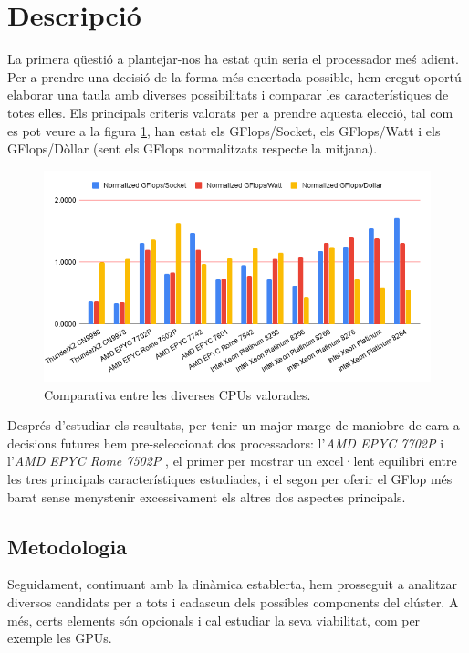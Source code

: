 \section{Descripció}

La primera qüestió a plantejar-nos ha estat quin seria el processador meś adient. Per a prendre una decisió de la forma més encertada possible, hem cregut oportú elaborar una taula amb diverses possibilitats i comparar les característiques de totes elles. Els principals criteris valorats per a prendre aquesta elecció, tal com es pot veure a la figura \ref{chartCPUs}, han estat els GFlops/Socket, els GFlops/Watt i els GFlops/Dòllar (sent els GFlops normalitzats respecte la mitjana). 

\begin{figure}[h]
    \centering
    \includegraphics[width=\textwidth]{img/chartCPU}
    \caption{Comparativa entre les diverses CPUs valorades.}
    \label{chartCPUs}
\end{figure}

Després d'estudiar els resultats, per tenir un major marge de maniobre de cara a decisions futures hem pre-seleccionat dos processadors: l'\textit{AMD EPYC 7702P} \cite{cpu_amd_7702_buy} i l'\textit{AMD EPYC Rome 7502P} \cite{cpu_amd_7502_buy}, el primer per mostrar un excel·lent equilibri entre les tres principals característiques estudiades, i el segon per oferir el GFlop més barat sense menystenir excessivament els altres dos aspectes principals.

\subsection{Metodologia}
Seguidament, continuant amb la dinàmica establerta, hem prosseguit a analitzar diversos candidats per a tots i cadascun dels possibles components del clúster. A més, certs elements són opcionals i cal estudiar la seva viabilitat, com per exemple les GPUs. 

